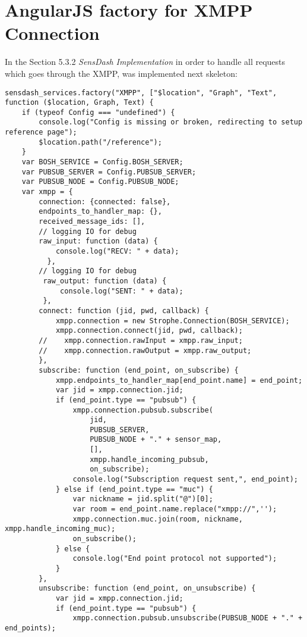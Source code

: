 \chapter{AngularJS factory for XMPP Connection}
In the Section 5.3.2 \emph{SensDash Implementation} in order to handle all requests which goes through the XMPP, was implemented next skeleton:
\begin{lstlisting}
sensdash_services.factory("XMPP", ["$location", "Graph", "Text", function ($location, Graph, Text) {
    if (typeof Config === "undefined") {
        console.log("Config is missing or broken, redirecting to setup reference page");
        $location.path("/reference");
    }
    var BOSH_SERVICE = Config.BOSH_SERVER;
    var PUBSUB_SERVER = Config.PUBSUB_SERVER;
    var PUBSUB_NODE = Config.PUBSUB_NODE;
    var xmpp = {
        connection: {connected: false},
        endpoints_to_handler_map: {},
        received_message_ids: [],
        // logging IO for debug
        raw_input: function (data) {
            console.log("RECV: " + data);
          },
        // logging IO for debug
         raw_output: function (data) {
             console.log("SENT: " + data);
         },
        connect: function (jid, pwd, callback) {
            xmpp.connection = new Strophe.Connection(BOSH_SERVICE);
            xmpp.connection.connect(jid, pwd, callback);
        //    xmpp.connection.rawInput = xmpp.raw_input;
        //    xmpp.connection.rawOutput = xmpp.raw_output;
        },
        subscribe: function (end_point, on_subscribe) {
            xmpp.endpoints_to_handler_map[end_point.name] = end_point;
            var jid = xmpp.connection.jid;
            if (end_point.type == "pubsub") {
                xmpp.connection.pubsub.subscribe(
                    jid,
                    PUBSUB_SERVER,
                    PUBSUB_NODE + "." + sensor_map,
                    [],
                    xmpp.handle_incoming_pubsub,
                    on_subscribe);
                console.log("Subscription request sent,", end_point);
            } else if (end_point.type == "muc") {
                var nickname = jid.split("@")[0];
                var room = end_point.name.replace("xmpp://",'');
                xmpp.connection.muc.join(room, nickname, xmpp.handle_incoming_muc);
                on_subscribe();
            } else {
                console.log("End point protocol not supported");
            }
        },
        unsubscribe: function (end_point, on_unsubscribe) {
            var jid = xmpp.connection.jid;
            if (end_point.type == "pubsub") {
                xmpp.connection.pubsub.unsubscribe(PUBSUB_NODE + "." + end_points);

\end{lstlisting}
